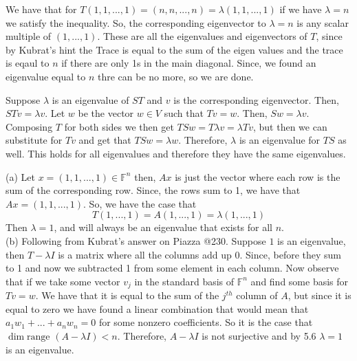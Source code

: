 \documentclass[10pt, twocolumn]{article}
\newcommand{\F}{\mathbb{F}}
\newcommand{\range}{\text{range }}
\begin{document}
\begin{q}[19]
	We have that for $ T(1, 1, ..., 1) = (n, n , ..., n) = \lambda (1, 1, ..., 1) $ if we have $ \lambda = n $ we satisfy the inequality.
	So, the corresponding eigenvector to $ \lambda = n $ is any scalar multiple of $ (1, ..., 1) $. 
	These are all the eigenvalues and eigenvectors of $ T $, since by Kubrat's hint the Trace is equal to the sum of the eigen values and the trace is eqaul to $ n $ if there are only 1s in the main diagonal. 
	Since, we found an eigenvalue equal to $ n $ thre can be no more, so we are done. 
\end{q}
\begin{q}[23]
	Suppose $ \lambda $ is an eigenvalue of $ ST $ and $ v $ is the corresponding eigenvector.
	Then, $ STv = \lambda v $. 
	Let $ w $ be the vector $ w \in V $ such that $ Tv = w $. 
	Then, $ Sw = \lambda v $. 
	Composing $ T $ for both sides we then get 
	$ TSw = T \lambda v = \lambda Tv $, but then we can substitute for $ Tv $ and get that 
	$ TSw = \lambda w $. Therefore, $ \lambda $ is an eigenvalue for $ TS $ as well. 
	This holds for all eigenvalues and therefore they have the same eigenvalues. 
\end{q}
\begin{q}[24]
	(a)
	Let $ x = (1, 1, ..., 1) \in \F^n $ then, $ Ax $ is just the vector where each row is the sum of the corresponding row.
	Since, the rows sum to 1, we have that $ Ax = (1, 1, ..., 1) $. So, we have the case that 
	$$ T(1, ..., 1) = A(1, ..., 1) = \lambda (1, ..., 1) $$
	Then $ \lambda = 1 $, and will always be an eigenvalue that exists for all $ n $. \\
	(b) Following from Kubrat's answer on Piazza @230. 
	Suppose $ 1 $ is an eigenvalue, then $ T - \lambda I $ is a matrix where all the columns add up 0. 
	Since, before they sum to 1 and now we subtracted 1 from some element in each column. 
	Now observe that if we take some vector $ v_j $ in the standard basis of $ \F^n $ and find some basis for $ Tv = w $.
	We have that it is equal to the sum of the $j^{th}$ column of $ A $, but since it is equal to zero we have found a linear combination that would mean that $ a_1 w_1 + ... + a_n w_n = 0 $ for some nonzero coefficients.
	So it is the case that $ \dim \range (A - \lambda I) < n $. 
	Therefore, $ A - \lambda I $ is not surjective and by 5.6 $ \lambda = 1 $ is an eigenvalue.
\end{q}
\end{document}
